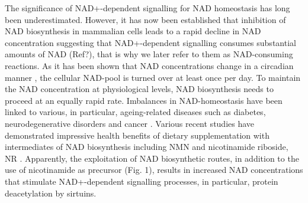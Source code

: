 \documentclass[paper=a4, 12pt]{scrartcl}
\begin{document}
The significance of NAD+-dependent signalling for NAD homeostasis has long been underestimated. However, it has now been established that inhibition of NAD biosynthesis in mammalian cells leads to a rapid decline in NAD concentration suggesting that NAD+-dependent signalling consumes substantial amounts of NAD (Ref?), that is why we later refer to them as NAD-consuming reactions. As it has been shown that NAD concentrations change in a circadian manner \cite{Nakahata2009; Ramsey2009}, the cellular NAD-pool is turned over at least once per day. To maintain the NAD concentration at physiological levels, NAD biosynthesis needs to proceed at an equally rapid rate. Imbalances in NAD-homeostasis have been linked to various, in particular, ageing-related diseases such as diabetes, neurodegenerative disorders and cancer \cite{Chiarugi2012; Verdin2015}. Various recent studies have demonstrated impressive health benefits of dietary supplementation with intermediates of NAD biosynthesis including NMN and nicotinamide riboside, NR \cite{Belenky2007}. Apparently, the exploitation of NAD biosynthetic routes, in addition to the use of nicotinamide as precursor (Fig. 1), results in increased NAD concentrations that stimulate NAD+-dependent signalling processes, in particular, protein deacetylation by sirtuins. 
\end{document}
